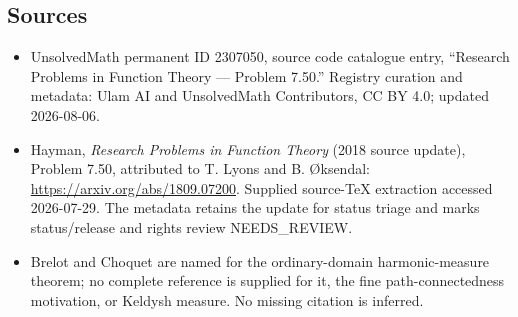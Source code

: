 \documentclass[11pt]{article}
\begin{document}
\subsection{Sources}
\begin{itemize}
\item UnsolvedMath permanent ID 2307050, source code catalogue entry, ``Research Problems in Function Theory --- Problem 7.50.'' Registry curation and metadata: Ulam AI and UnsolvedMath Contributors, CC BY 4.0; updated 2026-08-06.
\item Hayman, \emph{Research Problems in Function Theory} (2018 source update), Problem 7.50, attributed to T. Lyons and B. Øksendal: \url{https://arxiv.org/abs/1809.07200}. Supplied source-TeX extraction accessed 2026-07-29. The metadata retains the update for status triage and marks status/release and rights review NEEDS\_REVIEW.
\item Brelot and Choquet are named for the ordinary-domain harmonic-measure theorem; no complete reference is supplied for it, the fine path-connectedness motivation, or Keldysh measure. No missing citation is inferred.
\end{itemize}
\end{document}
